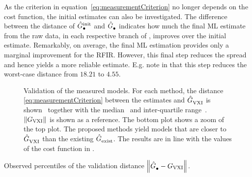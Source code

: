 As the criterion in equation~\eqref{eq:measurementCriterion} no longer depends on the cost function, the initial estimates can also be investigated.
The difference between the distance of $\model[init]{\bullet}$ and $\model{\bullet}$ indicates how much the final ML estimate from the raw data, in each respective branch of , improves over the initial estimate.
Remarkably, on average, the final ML estimation provides only a marginal improvement for the RFIR. 
However, this final step reduces the spread and hence yields a more reliable estimate.
E.g. note in  that this step reduces the worst-case distance from $18.21$ to $4.55$.


\begin{figure}[p]
  \centering
  \setlength{\figurewidth}{0.85\onecolumnwidth}
  \setlength{\figureheight}{0.68\figurewidth}
  \setlength{\figurewidth}{0.75\onecolumnwidth}
  
  \caption[Validation cost of the different measurements.]{Validation of the measured models. 
  For each method, the distance \eqref{eq:measurementCriterion} between the estimates and $\model{VXI}$ is shown~ together with the median~ and inter-quartile range~.
  $\norm{G_{\mathrm{VXI}}}$ is shown as a reference.
  The bottom plot shows a zoom of the top plot.
  The proposed methods yield models that are closer to $\model{VXI}$ than the existing $\model{exist}$.
  The results are in line with the values of the cost function in .}
  \label{fig:validationMeasurements}
\end{figure}
\begin{table}[p]
  \centering
  \caption{Observed percentiles of the validation distance $\norm{\model{\bullet}-G_{\mathrm{VXI}}}$.}
% 

\label{tbl:validationMeasurements}
\end{table}

